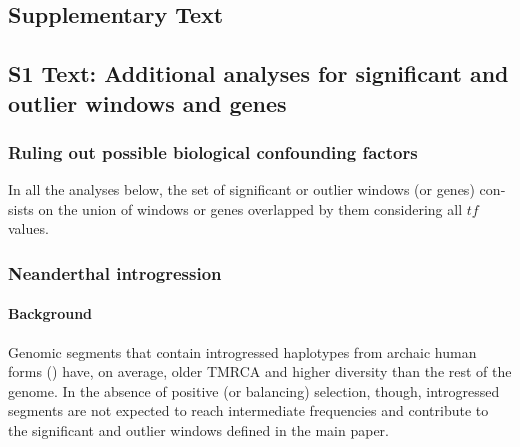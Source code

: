 \begin{refsection}
\begin{otherlanguage}{english}
\renewcommand*{\bibfont}{\footnotesize}
\printbibliography[heading=bibintoc]



\newpage

\section{Supplementary Text}
\subsection{S1 Text: Additional analyses for significant and outlier windows and genes}

\begin{footnotesize}
\subsubsection{Ruling out possible biological confounding factors}




In all the analyses below, the set of significant or outlier windows (or genes) consists on the union of windows or genes overlapped by them considering all $tf$ values.


\subsubsection{Neanderthal introgression}

\paragraph{Background} Genomic segments that contain introgressed haplotypes from archaic human forms (\cite{Meyer2012,Prufer2013}) have, on average, older TMRCA and higher diversity than the rest of the genome. In the absence of positive (or balancing) selection, though, introgressed segments are not expected to reach intermediate frequencies and contribute to the significant and outlier windows defined in the main paper.


\end{footnotesize}
\end{otherlanguage}
\end{refsection}
